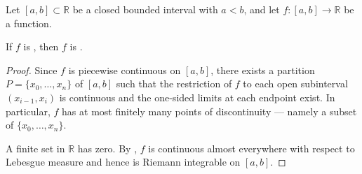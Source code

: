 \begin{proposition} \label{proposition:piecewise_continuous_functions_on_closed_intervals_are_riemann_integrable}
Let $[a,b] \subset \mathbb{R}$ be a closed bounded interval with $a < b$, and let $f : [a,b] \to \mathbb{R}$ be a function.

If $f$ is , then $f$ is .
\end{proposition}

\begin{proof}
Since $f$ is piecewise continuous on $[a,b]$, there exists a partition $P = \{x_0,\dots,x_n\}$ of $[a,b]$ such that the restriction of $f$ to each open subinterval $(x_{i-1},x_i)$ is continuous and the one-sided limits at each endpoint exist. In particular, $f$ has at most finitely many points of discontinuity — namely a subset of $\{x_0,\dots,x_n\}$.

A finite set in $\mathbb{R}$ has  zero. By , $f$ is continuous almost everywhere with respect to Lebesgue measure and hence is Riemann integrable on $[a,b]$.
\end{proof}
